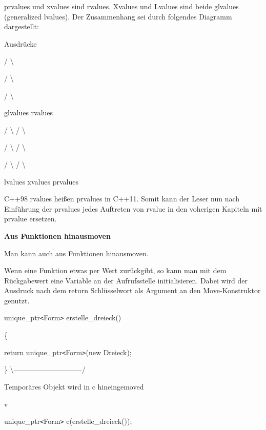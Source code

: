 \documentclass{article}
\begin{document}
prvalues und xvalues sind rvalues. Xvalues und Lvalues sind beide glvalues (generalized 
lvalues). Der Zusammenhang sei durch folgendes Diagramm dargestellt:          

\parindent=7pt
Ausdrücke          

\parindent=36pt
/     \textbackslash{}         

\parindent=32pt
/       \textbackslash{}        

\parindent=28pt
/         \textbackslash{}    

\parindent=14pt
glvalues   rvalues      

\parindent=21pt
/  \textbackslash{}       /  \textbackslash{}     

\parindent=18pt
/    \textbackslash{}     /    \textbackslash{}    

\parindent=14pt
/      \textbackslash{}   /      \textbackslash{}

\parindent=0pt
lvalues   xvalues   prvalues

\vspace{12pt}
C++98 rvalues heißen prvalues in C++11. Somit kann der Leser nun nach Einführung 
der prvalues jedes Auftreten von rvalue in den voherigen Kapiteln mit prvalue ersetzen.

\vspace{25pt}
\textbf{Aus Funktionen hinausmoven}

Man kann auch aus Funktionen hinausmoven.

Wenn eine Funktion etwas per Wert zurückgibt, so kann man mit dem Rückgabewert 
eine Variable an der Aufrufsstelle initialisieren. Dabei wird der Ausdruck nach 
dem return Schlüsselwort als Argument an den Move-Konstruktor genutzt.

unique\_ptr\texttt{<}Form\texttt{>} erstelle\_dreieck()

\{    

\parindent=14pt
return unique\_ptr\texttt{<}Form\texttt{>}(new Dreieck);

\parindent=0pt
\}          \textbackslash{}-----------------------------/                  

\parindent=64pt
\textbar{}                  

\textbar{} Temporäres Objekt wird in c hineingemoved                  

\textbar{}                  

\parindent=129pt
v

\parindent=0pt
unique\_ptr\texttt{<}Form\texttt{>} c(erstelle\_dreieck());
\end{document}
